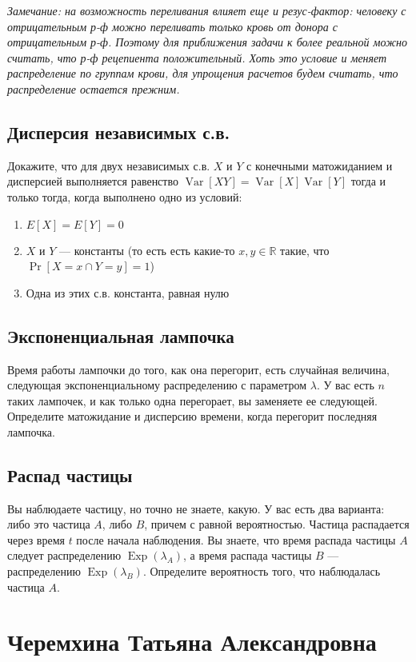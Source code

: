 \documentclass[12pt]{article}
\newcommand\R{\mathbb{R}}
\DeclareMathOperator{\Exp}{Exp}
\DeclareMathOperator{\Var}{Var}
\begin{document}
\emph{Замечание: на возможность переливания влияет еще и резус-фактор: человеку с отрицательным р-ф можно переливать только кровь от донора с отрицательным р-ф. Поэтому для приближения задачи к более реальной можно считать, что р-ф рецепиента положительный. Хоть это условие и меняет распределение по группам крови, для упрощения расчетов будем считать, что распределение остается прежним.}

\subsection{Дисперсия независимых с.в.}
Докажите, что для двух независимых с.в. $X$ и $Y$ с конечными матожиданием и дисперсией выполняется равенство $\Var[XY] = \Var[X]\Var[Y]$ тогда и только тогда, когда выполнено одно из условий:
\begin{enumerate}
    \item $E[X] = E[Y] = 0$
    \item $X$ и $Y$ --- константы (то есть есть какие-то $x, y \in \R$ такие, что $\Pr[X = x \cap Y = y] = 1$)
    \item Одна из этих с.в. константа, равная нулю
\end{enumerate}

\subsection{Экспоненциальная лампочка}
Время работы лампочки до того, как она перегорит, есть случайная величина, следующая экспоненциальному распределению с параметром $\lambda$. У вас есть $n$ таких лампочек, и как только одна перегорает, вы заменяете ее следующей. Определите матожидание и дисперсию времени, когда перегорит последняя лампочка.

\subsection{Распад частицы}
Вы наблюдаете частицу, но точно не знаете, какую. У вас есть два варианта: либо это частица $A$, либо $B$, причем с равной вероятностью. Частица распадается через время $t$ после начала наблюдения. Вы знаете, что время распада частицы $A$ следует распределению $\Exp(\lambda_A)$, а время распада частицы $B$ --- распределению $\Exp(\lambda_B)$. Определите вероятность того, что наблюдалась частица $A$.

\newpage
\section{Черемхина Татьяна Александровна}
\end{document}

